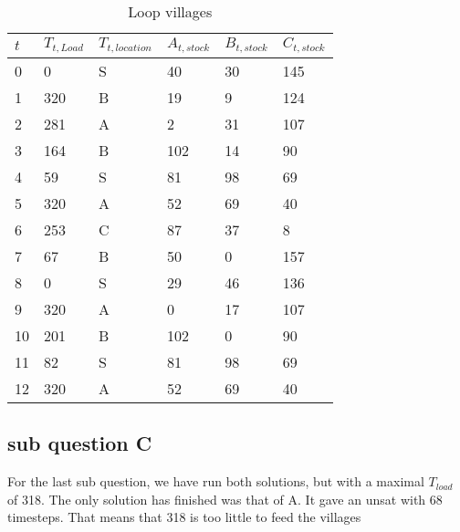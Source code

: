 \begin{table}[]
	\centering
	\caption{Loop villages}
	\label{table:LoopVillages}
	\begin{tabular}{@{}llllll@{}}
		\toprule
		$t$ & $T_{t,Load}$ & $T_{t,location}$ & $A_{t,stock}$ & $B_{t,stock}$ & $C_{t,stock}$ \\ \midrule
		0        & 0     & S    & 40     & 30     & 145    \\
		1        & 320   & B    & 19     & 9      & 124    \\
		2        & 281   & A    & 2      & 31     & 107    \\
		3        & 164   & B    & 102    & 14     & 90     \\
		4        & 59    & S    & 81     & 98     & 69     \\
		\rowcolor[HTML]{FE996B} 
		5        & 320   & A    & 52     & 69     & 40     \\
		6        & 253   & C    & 87     & 37     & 8      \\
		7        & 67    & B    & 50     & 0      & 157    \\
		8        & 0     & S    & 29     & 46     & 136    \\
		9        & 320   & A    & 0      & 17     & 107    \\
		10       & 201   & B    & 102    & 0      & 90     \\
		11       & 82    & S    & 81     & 98     & 69     \\
		\rowcolor[HTML]{FE996B} 
		12       & 320   & A    & 52     & 69     & 40     \\ \bottomrule
	\end{tabular}
\end{table}

\subsection{sub question C}
For the last sub question, we have run both solutions, but with a maximal $T_{load}$ of 318. The only solution has finished was that of A. It gave an unsat with 68 timesteps. That means that 318 is too little to feed the villages 
